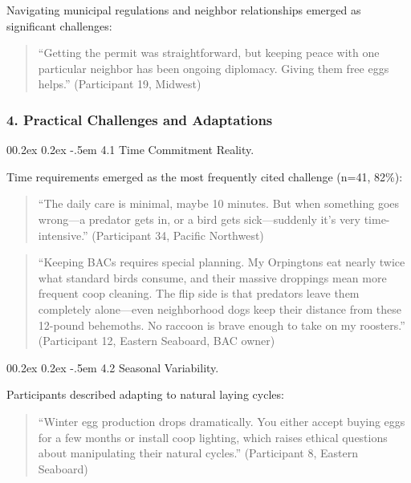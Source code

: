 \documentclass[
  man,
  floatsintext,
  longtable,
  nolmodern,
  notxfonts,
  notimes,
  colorlinks=true,linkcolor=blue,citecolor=blue,urlcolor=blue]{apa7}
\makeatletter
\renewcommand{\paragraph}{\@startsection{paragraph}{4}{\parindent}%
	{0\baselineskip \@plus 0.2ex \@minus 0.2ex}%
	{-.5em}%
	{\normalfont\normalsize\bfseries\typesectitle}}
\makeatother
\begin{document}
Navigating municipal regulations and neighbor relationships emerged as
significant challenges:

\begin{quote}
``Getting the permit was straightforward, but keeping peace with one
particular neighbor has been ongoing diplomacy. Giving them free eggs
helps.'' (Participant 19, Midwest)
\end{quote}

\subsubsection{4. Practical Challenges and
Adaptations}\label{practical-challenges-and-adaptations}

\paragraph{4.1 Time Commitment Reality.}\label{time-commitment-reality}

Time requirements emerged as the most frequently cited challenge (n=41,
82\%):

\begin{quote}
``The daily care is minimal, maybe 10 minutes. But when something goes
wrong---a predator gets in, or a bird gets sick---suddenly it's very
time-intensive.'' (Participant 34, Pacific Northwest)
\end{quote}

\begin{quote}
``Keeping BACs requires special planning. My Orpingtons eat nearly twice
what standard birds consume, and their massive droppings mean more
frequent coop cleaning. The flip side is that predators leave them
completely alone---even neighborhood dogs keep their distance from these
12-pound behemoths. No raccoon is brave enough to take on my roosters.''
(Participant 12, Eastern Seaboard, BAC owner)
\end{quote}

\paragraph{4.2 Seasonal Variability.}\label{seasonal-variability}

Participants described adapting to natural laying cycles:

\begin{quote}
``Winter egg production drops dramatically. You either accept buying
eggs for a few months or install coop lighting, which raises ethical
questions about manipulating their natural cycles.'' (Participant 8,
Eastern Seaboard)
\end{quote}
\end{document}

